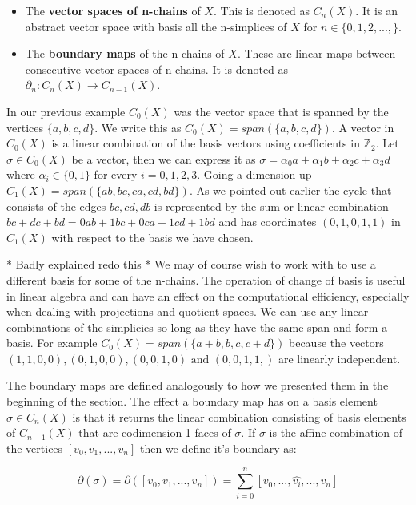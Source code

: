 \begin{itemize}
    \item The \textbf{vector spaces of n-chains} of $X$. This is denoted as $C_n(X)$. It is an abstract vector space with basis all the n-simplices of $X$ for $n \in \{0, 1, 2, ..., \}$.
    \item The \textbf{boundary maps} of the n-chains of $X$. These are linear maps between consecutive vector spaces of n-chains. It is denoted as $\partial_n : C_n(X) \to C_{n-1}(X)$.
\end{itemize}

In our previous example $C_0(X)$ was the vector space that is spanned by the vertices $\{a, b, c, d\}$. We write this as $C_0(X) = span(\{a, b, c, d\})$. A vector in $C_0(X)$ is a linear combination of the basis vectors using coefficients in $\mathbb{Z}_2$. Let $\sigma \in C_0(X)$ be a vector, then we can express it as $\sigma  = \alpha_0a + \alpha_1b + \alpha_2c + \alpha_3d$ where $\alpha_i \in \{0 ,1\}$ for every $i = 0, 1, 2, 3$. Going a dimension up $C_1(X) = span(\{ab, bc, ca, cd, bd\})$. As we pointed out earlier the cycle that consists of the edges $bc, cd, db$ is represented by the sum or linear combination $bc + dc + bd = 0ab + 1bc + 0ca + 1cd + 1bd$ and has coordinates $(0, 1, 0, 1, 1)$ in $C_1(X)$ with respect to the basis we have chosen.

* Badly explained redo this *
We may of course wish to work with to use a different basis for some of the n-chains. The operation of change of basis is useful in linear algebra and can have an effect on the computational efficiency, especially when dealing with projections and quotient spaces. We can use any linear combinations of the simplicies so long as they have the same span and form a basis. For example $C_0(X) = span(\{a + b, b, c, c + d\})$ because the vectors $(1, 1, 0, 0), (0, 1, 0, 0), (0, 0, 1, 0) \text { and } (0, 0, 1, 1,)$ are linearly independent.

The boundary maps are defined analogously to how we presented them in the beginning of the section. The effect a boundary map has on a basis element $\sigma \in C_n(X)$ is that it returns the linear combination consisting of basis elements of $C_{n-1}(X)$ that are codimension-1 faces of $\sigma$. If $\sigma$ is the affine combination of the vertices $[v_0, v_1, ..., v_n]$ then we define it's boundary as:

$$ \partial(\sigma) = \partial([v_0, v_1, ..., v_n]) = \sum_{i=0}^{n}[v_0, ... , \hat{v_i}, ..., v_n] $$

